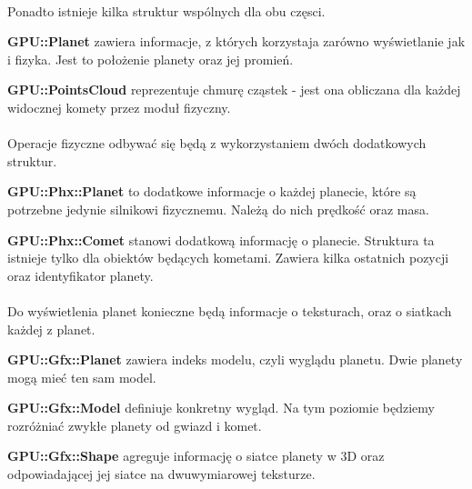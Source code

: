 \paragraph{}
Ponadto istnieje kilka struktur wspólnych dla obu częsci.

\begin{description}
\item{\bf GPU::Planet} zawiera informacje, z których korzystaja zarówno wyświetlanie jak i fizyka. Jest to położenie planety oraz jej promień.
\item{\bf GPU::PointsCloud} reprezentuje chmurę cząstek - jest ona obliczana dla każdej widocznej komety przez moduł fizyczny.
\end{description}

\paragraph{}

Operacje fizyczne odbywać się będą z wykorzystaniem dwóch dodatkowych struktur.

\begin{description}
\item{\bf GPU::Phx::Planet} to dodatkowe informacje o każdej planecie, które są potrzebne jedynie silnikowi fizycznemu. Należą do nich prędkość oraz masa.
\item{\bf GPU::Phx::Comet} stanowi dodatkową informację o planecie. Struktura ta istnieje tylko dla obiektów będących kometami. Zawiera kilka ostatnich pozycji oraz identyfikator planety.
\end{description}

\paragraph{}

Do wyświetlenia planet konieczne będą informacje o teksturach, oraz o siatkach każdej z planet.

\begin{description}
\item{\bf GPU::Gfx::Planet} zawiera indeks modelu, czyli wyglądu planetu. Dwie planety mogą mieć ten sam model.
\item{\bf GPU::Gfx::Model} definiuje konkretny wygląd. Na tym poziomie będziemy rozróżniać zwykłe planety od gwiazd i komet.
\item{\bf GPU::Gfx::Shape} agreguje informację o siatce planety w 3D oraz odpowiadającej jej siatce na dwuwymiarowej teksturze.
\end{description}

